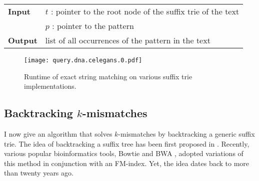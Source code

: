 \begin{figure*}[t]
\begin{center}
\begin{minipage}[t]{.8\textwidth}
\begin{algorithm}[H]
\begin{tabular}{ll}
\textbf{Input}  & $t$ : pointer to the root node of the suffix trie of the text\\
				& $p$ : pointer to the pattern\\
\textbf{Output} & list of all occurrences of the pattern in the text\\
\end{tabular}
\begin{algorithmic}[1]
	\State \Report {}
		\State {}
\EndIf
\end{algorithmic}
\label{alg:st-exact}
\end{algorithm}
\end{minipage}
\end{center}
\end{figure*}

\begin{figure}[b]
\begin{center}
\caption[Exact string matching runtime]{Runtime of exact string matching on various suffix trie implementations.}
\label{fig:query-dna-exact}
\texttt{[image: query.dna.celegans.0.pdf]}
\end{center}
\end{figure}

%

\subsection{Backtracking $k$-mismatches}
\label{sec:index:algo:kmismatches}

I now give an algorithm that solves $k$-mismatches by backtracking a generic suffix trie.
The idea of backtracking a suffix tree has been first proposed in \citep{Ukkonen1993}.
Recently, various popular bioinformatics tools, \eg Bowtie \citep{Langmead2009} and BWA \citep{Li2009}, adopted variations of this method in conjunction with an FM-index.
Yet, the idea dates back to more than twenty years ago.


